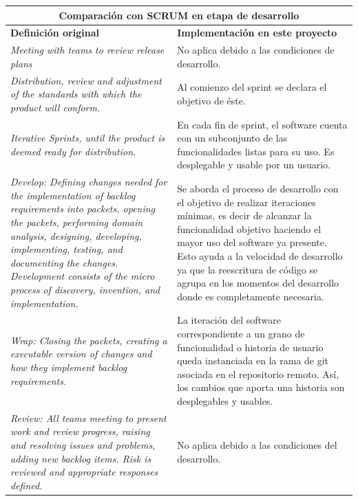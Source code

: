 \begin{table}[]
    \centering
    \begin{tabular}{p{5cm} p{6cm}}
        \multicolumn{2}{c}{\textbf{Comparación con SCRUM en etapa de desarrollo}} \\
        \hline 
        \textbf{Definición original} & \textbf{Implementación en este proyecto} \\ \hline \hline
        
        \textit{Meeting with teams to review release plans} & No aplica debido a las condiciones de desarrollo. \\ \hline
        
        \textit{Distribution, review and adjustment of the standards with which the product will conform.} & Al comienzo del sprint se declara el objetivo de éste. \\ \hline
        
        \textit{Iterative Sprints, until the product is deemed ready for distribution.} & En cada fin de sprint, el software cuenta con un subconjunto de las funcionalidades listas para su uso. Es desplegable y usable por un usuario. \\ \hline
        
        \textit{Develop: Defining changes needed for the implementation of backlog requirements into packets, opening the packets, performing domain analysis, designing, developing, implementing, testing, and documenting the changes. Development consists of the micro process of discovery, invention, and implementation.} 
        & 
        Se aborda el proceso de desarrollo con el objetivo de realizar iteraciones mínimas, es decir de alcanzar la funcionalidad objetivo haciendo el mayor uso del software ya presente. Esto ayuda a la velocidad de desarrollo ya que la reescritura de código se agrupa en los momentos del desarrollo donde es completamente necesaria. \\ \hline
        
        \textit{Wrap: Closing the packets, creating a executable version of changes and how they implement backlog requirements.} & La iteración del software correspondiente a un grano de funcionalidad o historia de usuario queda instanciada en la rama de git asociada en el repositorio remoto. Así, los cambios que aporta una historia son desplegables y usables. \\ \hline
        
        \textit{Review: All teams meeting to present work and review progress, raising and resolving issues and problems, adding new backlog items. Risk is reviewed and appropriate responses defined.} & No aplica debido a las condiciones del desarrollo. \\ \hline
        

\end{tabular}
\end{table}

